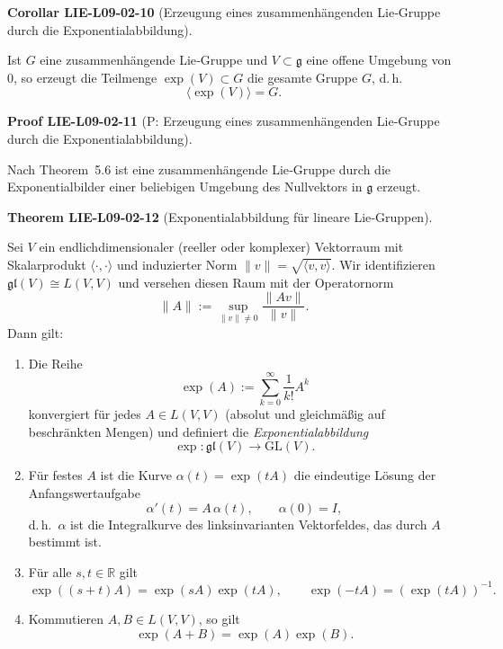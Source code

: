 \documentclass[10pt, letterpaper]{article}
\newcommand{\GL}{\mathrm{GL}}
\newcommand{\CustomHeading}[3]{%
  \par\medskip\noindent%
  \textbf{#1 #2} \textnormal{(#3)}.\enskip%
}
\newenvironment{THEO}[2]{\CustomHeading{Theorem}{#1}{#2}}{}
\newenvironment{KORO}[2]{\CustomHeading{Corollar}{#1}{#2}}{}
\newenvironment{PROOF}[2]{\CustomHeading{Proof}{#1}{#2}}{}
\begin{document}
\begin{KORO}{LIE-L09-02-10}{Erzeugung eines zusammenhängenden Lie‐Gruppe durch die Exponentialabbildung}
Ist $G$ eine zusammenhängende Lie‐Gruppe und $V\subset\mathfrak g$ eine offene Umgebung von $0$,
so erzeugt die Teilmenge $\exp(V)\subset G$ die gesamte Gruppe $G$, d.\,h.
\[
\langle\exp(V)\rangle = G.
\]
\end{KORO}

\begin{PROOF}{LIE-L09-02-11}{P: Erzeugung eines zusammenhängenden Lie‐Gruppe durch die Exponentialabbildung}
Nach Theorem~5.6 ist eine zusammenhängende Lie‐Gruppe durch die Exponentialbilder
einer beliebigen Umgebung des Nullvektors in $\mathfrak g$ erzeugt.
\end{PROOF}

\begin{THEO}{LIE-L09-02-12}{Exponentialabbildung für lineare Lie‐Gruppen}
Sei $V$ ein endlichdimensionaler (reeller oder komplexer) Vektorraum mit Skalarprodukt
$\langle\cdot,\cdot\rangle$ und induzierter Norm $\|v\|=\sqrt{\langle v,v\rangle}$.
Wir identifizieren $\mathfrak{gl}(V)\cong L(V,V)$ und versehen diesen Raum mit der Operatornorm
\[
\|A\|:=\sup_{\|v\|\neq 0}\frac{\|Av\|}{\|v\|}.
\]
Dann gilt:
\begin{enumerate}
\item Die Reihe
\[
\exp(A):=\sum_{k=0}^{\infty}\frac{1}{k!}A^k
\]
konvergiert für jedes $A\in L(V,V)$ (absolut und gleichmäßig auf beschränkten Mengen)
und definiert die \emph{Exponentialabbildung}
\[
\exp:\mathfrak{gl}(V)\to \GL(V).
\]
\item Für festes $A$ ist die Kurve $\alpha(t)=\exp(tA)$ die eindeutige Lösung der Anfangswertaufgabe
\[
\alpha'(t)=A\,\alpha(t),\qquad \alpha(0)=I,
\]
d.\,h.\ $\alpha$ ist die Integralkurve des linksinvarianten Vektorfeldes, das durch $A$ bestimmt ist.
\item Für alle $s,t\in\mathbb R$ gilt
\[
\exp((s+t)A)=\exp(sA)\exp(tA),
\qquad
\exp(-tA)=(\exp(tA))^{-1}.
\]
\item Kommutieren $A,B\in L(V,V)$, so gilt
\[
\exp(A+B)=\exp(A)\exp(B).
\]
\end{enumerate}
\end{THEO}
\end{document}
